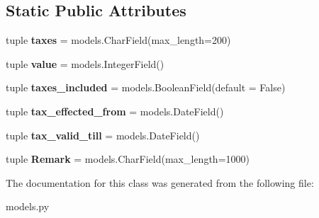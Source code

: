\subsection*{Static Public Attributes}
\begin{DoxyCompactItemize}
\item 
\hypertarget{classlibrehatti_1_1catalog_1_1models_1_1Surcharge_adaabe9567e606abaa08e7b653e4a08dc}{tuple {\bfseries taxes} = models.\-Char\-Field(max\-\_\-length=200)}\label{classlibrehatti_1_1catalog_1_1models_1_1Surcharge_adaabe9567e606abaa08e7b653e4a08dc}

\item 
\hypertarget{classlibrehatti_1_1catalog_1_1models_1_1Surcharge_a6a0a37261bf13ac475141f7a7d946949}{tuple {\bfseries value} = models.\-Integer\-Field()}\label{classlibrehatti_1_1catalog_1_1models_1_1Surcharge_a6a0a37261bf13ac475141f7a7d946949}

\item 
\hypertarget{classlibrehatti_1_1catalog_1_1models_1_1Surcharge_a6c3521bf9e35f0d60ddcca887b0682f0}{tuple {\bfseries taxes\-\_\-included} = models.\-Boolean\-Field(default = False)}\label{classlibrehatti_1_1catalog_1_1models_1_1Surcharge_a6c3521bf9e35f0d60ddcca887b0682f0}

\item 
\hypertarget{classlibrehatti_1_1catalog_1_1models_1_1Surcharge_a11bc15d4fbe997aa74ef349d3b76bffa}{tuple {\bfseries tax\-\_\-effected\-\_\-from} = models.\-Date\-Field()}\label{classlibrehatti_1_1catalog_1_1models_1_1Surcharge_a11bc15d4fbe997aa74ef349d3b76bffa}

\item 
\hypertarget{classlibrehatti_1_1catalog_1_1models_1_1Surcharge_a024bd9f4db5f87b1c8678aaecde0943e}{tuple {\bfseries tax\-\_\-valid\-\_\-till} = models.\-Date\-Field()}\label{classlibrehatti_1_1catalog_1_1models_1_1Surcharge_a024bd9f4db5f87b1c8678aaecde0943e}

\item 
\hypertarget{classlibrehatti_1_1catalog_1_1models_1_1Surcharge_a8406404e2369d4e81a89a1bed75a9807}{tuple {\bfseries Remark} = models.\-Char\-Field(max\-\_\-length=1000)}\label{classlibrehatti_1_1catalog_1_1models_1_1Surcharge_a8406404e2369d4e81a89a1bed75a9807}

\end{DoxyCompactItemize}


The documentation for this class was generated from the following file\-:\begin{DoxyCompactItemize}
\item 
models.\-py\end{DoxyCompactItemize}
